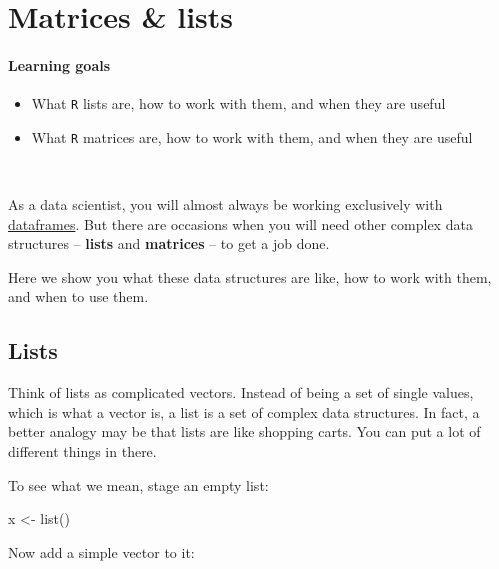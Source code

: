 \documentclass[
]{book}
\newenvironment{Shaded}{\begin{snugshade}}{\end{snugshade}}
\newcommand{\FunctionTok}[1]{\textcolor[rgb]{0.00,0.00,0.00}{#1}}
\newcommand{\NormalTok}[1]{#1}
\newcommand{\OtherTok}[1]{\textcolor[rgb]{0.56,0.35,0.01}{#1}}
\providecommand{\tightlist}{%
  \setlength{\itemsep}{0pt}\setlength{\parskip}{0pt}}
\begin{document}
\hypertarget{matrices-lists}{%
\chapter{Matrices \& lists}\label{matrices-lists}}

\hypertarget{learning-goals-19}{%
\subsubsection*{Learning goals}\label{learning-goals-19}}

\begin{itemize}
\tightlist
\item
  What \texttt{R} lists are, how to work with them, and when they are useful\\
\item
  What \texttt{R} matrices are, how to work with them, and when they are useful
\end{itemize}

~

As a data scientist, you will almost always be working exclusively with \protect\hyperlink{dataframes}{dataframes}. But there are occasions when you will need other complex data structures -- \textbf{lists} and \textbf{matrices} -- to get a job done.

Here we show you what these data structures are like, how to work with them, and when to use them.

\hypertarget{lists}{%
\section*{Lists}\label{lists}}

Think of lists as complicated vectors. Instead of being a set of single values, which is what a vector is, a list is a set of complex data structures. In fact, a better analogy may be that lists are like shopping carts. You can put a lot of different things in there.

To see what we mean, stage an empty list:

\begin{Shaded}
\begin{Highlighting}[]
\NormalTok{x }\OtherTok{\textless{}{-}} \FunctionTok{list}\NormalTok{()}
\end{Highlighting}
\end{Shaded}

Now add a simple vector to it:
\end{document}
